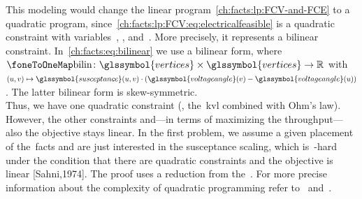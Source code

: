 This modeling would change the linear program~\cref{ch:facts:lp:FCV-and-FCE} to
a quadratic program, since~\cref{ch:facts:lp:FCV:eq:electricalfeasible} is a
quadratic constraint with variables~, ,
and~. More precisely, it represents a bilinear
constraint. In~\cref{ch:facts:eq:bilinear} we use a bilinear form,
where~$\bilinearmap\colon\glssymbol{vertices}\times
\glssymbol{vertices}\to\reals$ with~$(\vertexa,\vertexb)\mapsto\glssymbol{susceptance}
(\vertexa,\vertexb) \cdot ( \glssymbol{voltageangle}(\vertexb) - \glssymbol{voltageangle}(\vertexa) )$.
The latter bilinear form is skew-symmetric.
% 
\begin{subequations}
    
    \label{ch:facts:eq:bilinear}
\end{subequations}
% 
Thus, we have one quadratic constraint (\ie, the~\gls{kvl} combined with
Ohm's law). However, the other constraints and---in terms of maximizing the
throughput---also the objective stays linear. 
% 
In the first problem, we assume a given placement of the~\gls{facts} and are
just interested in the susceptance scaling, which is~\NP-hard under the
condition that there are quadratic constraints and the objective is linear
[Sahni,1974]. The proof uses a reduction from the~\PartitionP. For more precise
information about the complexity of quadratic programming refer
to~\textcite[p.245; MP2]{Gar79} and~\textcite[p.447; MP5]{Aus99}.
%
\begingroup
    
    \label{ch:facts:problem:maximum-facts-flow-problem-with-Ef-optimization-problem}
\endgroup
%
% 
